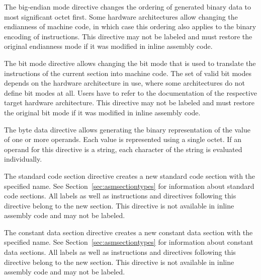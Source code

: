 
The big-endian mode directive changes the ordering of generated binary data to most significant octet first.
Some hardware architectures allow changing the endianness of machine code, in which case this ordering also applies to the binary encoding of instructions.
This directive may not be labeled and must restore the original endianness mode if it was modified in inline assembly code.


The bit mode directive allows changing the bit mode that is used to translate the instructions of the current section into machine code.
The set of valid bit modes depends on the hardware architecture in use, where some architectures do not define bit modes at all.
Users have to refer to the documentation of the respective target hardware architecture.
This directive may not be labeled and must restore the original bit mode if it was modified in inline assembly code.


The byte data directive allows generating the binary representation of the value of one or more operands.
Each value is represented using a single octet.
If an operand for this directive is a string, each character of the string is evaluated individually.


The standard code section directive creates a new standard code section with the specified name.
See Section~\ref{sec:asmsectiontypes} for information about standard code sections.
All labels as well as instructions and directives following this directive belong to the new section.
This directive is not available in inline assembly code and may not be labeled.


The constant data section directive creates a new constant data section with the specified name.
See Section~\ref{sec:asmsectiontypes} for information about constant data sections.
All labels as well as instructions and directives following this directive belong to the new section.
This directive is not available in inline assembly code and may not be labeled.


